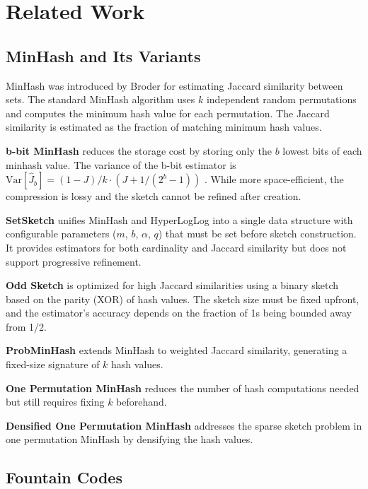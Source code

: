 \documentclass[11pt,letterpaper]{article}
\begin{document}
\section{Related Work}

\subsection{MinHash and Its Variants}

MinHash was introduced by Broder \cite{Broder1997} for estimating Jaccard similarity between sets. The standard MinHash algorithm uses $k$ independent random permutations and computes the minimum hash value for each permutation. The Jaccard similarity is estimated as the fraction of matching minimum hash values.

\textbf{b-bit MinHash} \cite{Li2009} reduces the storage cost by storing only the $b$ lowest bits of each minhash value. The variance of the b-bit estimator is $\text{Var}[\hat{J}_b] = (1-J)/k \cdot (J + 1/(2^b - 1))$ \cite{Li2011}. While more space-efficient, the compression is lossy and the sketch cannot be refined after creation.

\textbf{SetSketch} \cite{Ertl2021} unifies MinHash and HyperLogLog into a single data structure with configurable parameters ($m$, $b$, $\alpha$, $q$) that must be set before sketch construction. It provides estimators for both cardinality and Jaccard similarity but does not support progressive refinement.

\textbf{Odd Sketch} \cite{Mitzenmacher2014} is optimized for high Jaccard similarities using a binary sketch based on the parity (XOR) of hash values. The sketch size must be fixed upfront, and the estimator's accuracy depends on the fraction of 1s being bounded away from 1/2.

\textbf{ProbMinHash} \cite{Ertl2019} extends MinHash to weighted Jaccard similarity, generating a fixed-size signature of $k$ hash values.

\textbf{One Permutation MinHash} \cite{Li2014} reduces the number of hash computations needed but still requires fixing $k$ beforehand.

\textbf{Densified One Permutation MinHash} \cite{Shrivastava2017} addresses the sparse sketch problem in one permutation MinHash by densifying the hash values.

\subsection{Fountain Codes}
\end{document}

